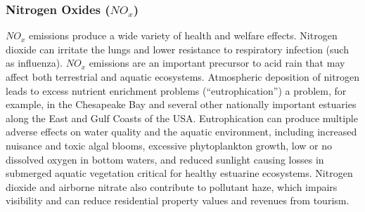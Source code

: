 \subsubsection{Nitrogen Oxides ($ NO_x $)}
$ NO_x $ emissions produce a wide variety of health and welfare effects. Nitrogen dioxide can irritate the lungs and lower resistance to respiratory infection (such as influenza). $ NO_x $ emissions are an important precursor to acid rain that may affect both terrestrial and aquatic ecosystems. Atmospheric deposition of nitrogen leads to excess nutrient enrichment problems (“eutrophication”) a problem, for example, in the Chesapeake Bay and several other nationally important estuaries along the East and Gulf Coasts of the USA. Eutrophication can produce multiple adverse effects on water quality and the aquatic environment, including increased nuisance and toxic algal blooms, excessive phytoplankton growth, low or no dissolved oxygen in bottom waters, and reduced sunlight causing losses in submerged aquatic vegetation critical for healthy estuarine ecosystems. Nitrogen dioxide and airborne nitrate also contribute to pollutant haze, which impairs visibility and can reduce residential property values and revenues from tourism.
